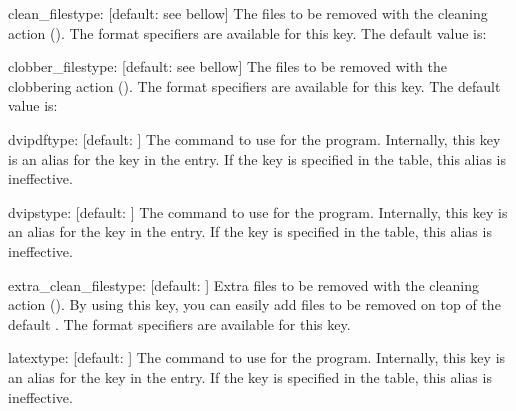 \documentclass{llmk-doc}
\begin{document}
\begin{confkey}{clean\_files}{type: }
  [default: see bellow]
The files to be removed with the cleaning action (). The format
specifiers are available for this key. The default value is:
%
\begin{htcode}
[
  "%
  "%
  "%
]
\end{htcode}
\end{confkey}

\begin{confkey}{clobber\_files}{type: }
  [default: see bellow]
The files to be removed with the clobbering action (). The format
specifiers are available for this key. The default value is:
%
\end{confkey}

\begin{confkey}{dvipdf}{type: }[default: ]
The command to use for the  program. Internally, this key is
an alias for the  key in the  entry. If the
 key is specified in the  table, this alias is
ineffective.
\end{confkey}

\begin{confkey}{dvips}{type: }[default: ]
The command to use for the  program. Internally, this key is an
alias for the  key in the  entry. If the
 key is specified in the  table, this alias is
ineffective.
\end{confkey}

\begin{confkey}{extra\_clean\_files}{type: }
  [default: \code{[]}]
Extra files to be removed with the cleaning action (). By using
this key, you can easily add files to be removed on top of the default
. The format specifiers are available for this key.
\end{confkey}

\begin{confkey}{latex}{type: }[default: ]
The command to use for the  program. Internally, this key is an
alias for the  key in the  entry. If the
 key is specified in the  table, this alias is
ineffective.
\end{confkey}
\end{document}
